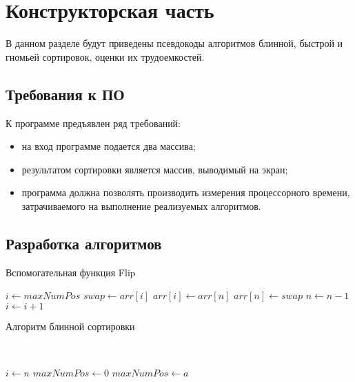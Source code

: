 \chapter{Конструкторская часть}

В данном разделе будут приведены псевдокоды алгоритмов блинной, быстрой и гномьей сортировок, оценки их трудоемкостей.

\section{Требования к ПО}

К программе предъявлен ряд требований:

\begin{itemize}
    \item на вход программе подается два массива;
    \item результатом сортировки является массив, выводимый на экран;
    \item программа должна позволять производить измерения процессорного времени, затрачиваемого на выполнение реализуемых алгоритмов.
\end{itemize}

\section{Разработка алгоритмов}

\begin{algorithm}[H]
    \caption{Вспомогательная функция Flip}
    \label{alg:pancake-sort-flip}
    \begin{algorithmic}[1]
        \State $i\gets maxNumPos$
        \State $swap\gets arr[i]$
        \State $arr[i]\gets arr[n]$
        \State $arr[n]\gets swap$
        \State $n\gets n - 1$
        \State $i\gets i + 1$
        \EndWhile
        \EndProcedure
    \end{algorithmic}
\end{algorithm}

\begin{algorithm}[H]
    \caption{Алгоритм блинной сортировки}
    \label{alg:pancake-sort}
    \\

    \begin{algorithmic}[1]
        \State $i\gets n$
        \State $maxNumPos\gets 0$
        \State $maxNumPos\gets a$
        \EndIf
        \EndFor
        \State {}
        \EndIf
        \EndWhile
        \EndIf
        \EndProcedure
    \end{algorithmic}
\end{algorithm}


